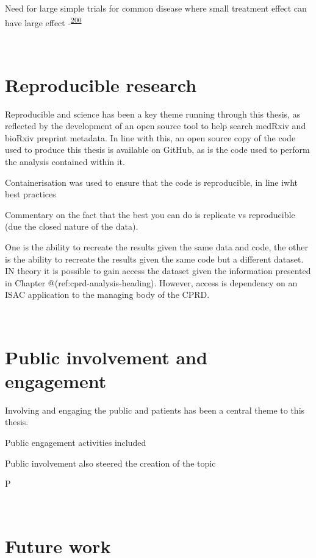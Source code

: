 \documentclass[a4paper, twoside]{templates/ociamthesis}
\begin{document}
Need for large simple trials for common disease where small treatment effect can have large effect -\textsuperscript{\protect\hyperlink{ref-yusuf1984}{200}}

~

\hypertarget{reproducible-research}{%
\section{Reproducible research}\label{reproducible-research}}

Reproducible and science has been a key theme running through this thesis, as reflected by the development of an open source tool to help search medRxiv and bioRxiv preprint metadata. In line with this, an open source copy of the code used to produce this thesis is available on GitHub, as is the code used to perform the analysis contained within it.

Containerisation was used to ensure that the code is reproducible, in line iwht best practices

Commentary on the fact that the best you can do is replicate vs reproducible (due the closed nature of the data).

One is the ability to recreate the results given the same data and code, the other is the ability to recreate the results given the same code but a different dataset. IN theory it is possible to gain access the dataset given the information presented in Chapter @(ref:cprd-analysis-heading). However, access is dependency on an ISAC application to the managing body of the CPRD.

~

\hypertarget{disc-PPI}{%
\section{Public involvement and engagement}\label{disc-PPI}}

Involving and engaging the public and patients has been a central theme to this thesis.

Public engagement activities included

Public involvement also steered the creation of the topic

P

~

\hypertarget{future-work}{%
\section{Future work}\label{future-work}}
\end{document}
